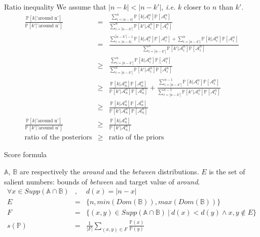 \documentclass[xcolor=table, hyperref={pdfpagelabels=false}]{beamer}
\begin{document}
\begin{frame}{Ratio inequality}
\normalsize
We assume that $|n-k| < |n-k'|$, \textit{i.e.} $k$ closer to $n$ than $k'$.
\tiny
\begin{eqnarray*}
	\frac{\mathds{P}[k|\mbox{'around n'}]}{\mathds{P}[k'|\mbox{'around n'}]} &=& \frac{\sum_{i = |n-k|}^n \mathds{P}[k|\mathcal{A}^n_i]\mathds{P}[\mathcal{A}^n_i]}{\sum_{i = |n-k'|}^n \mathds{P}[k'|\mathcal{A}^n_i]\mathds{P}[\mathcal{A}^n_i]}\\
	&=& \frac{\sum_{i = |n-k|}^{|n-k'|-1} \mathds{P}[k|\mathcal{A}^n_i]\mathds{P}[\mathcal{A}^n_i] +\sum_{i = |n-k'|}^n \mathds{P}[k|\mathcal{A}^n_i]\mathds{P}[\mathcal{A}^n_i]}{\sum_{i = |n-k'|}^n \mathds{P}[k'|\mathcal{A}^n_i]\mathds{P}[\mathcal{A}^n_i]}\\
	&\geq& \frac{\sum_{i = |n-k'|}^n \mathds{P}[k|\mathcal{A}^n_i]\mathds{P}[\mathcal{A}^n_i]}{\sum_{i = |n-k'|}^n \mathds{P}[k'|\mathcal{A}^n_i]\mathds{P}[\mathcal{A}^n_i]} \\
	&\geq& \frac{\mathds{P}[k|\mathcal{A}^n_n]\mathds{P}[\mathcal{A}^n_n]}{\mathds{P}[k'|\mathcal{A}^n_n]\mathds{P}[\mathcal{A}^n_n]} + \frac{\sum_{i = |n-k'|}^{n-1} \mathds{P}[k|\mathcal{A}^n_i]\mathds{P}[\mathcal{A}^n_i]}{\sum_{i = |n-k'|}^{n-1} \mathds{P}[k'|\mathcal{A}^n_i]\mathds{P}[\mathcal{A}^n_i]} \\
	&\geq& \frac{\mathds{P}[k|\mathcal{A}^n_n]\mathds{P}[\mathcal{A}^n_n]}{\mathds{P}[k'|\mathcal{A}^n_n]\mathds{P}[\mathcal{A}^n_n]} \\
	\frac{\mathds{P}[k|\mbox{'around n'}]}{\mathds{P}[k'|\mbox{'around n'}]} &\geq& \frac{\mathds{P}[k|\mathcal{A}^n_n]}{\mathds{P}[k'|\mathcal{A}^n_n]} \\
	\mbox{ratio of the posteriors} &\geq& \mbox{ratio of the priors}
\end{eqnarray*}
\end{frame}

\begin{frame}{Score formula}

$\mathds{A}$, $\mathds{B}$ are respectively the \textit{around} and the \textit{between} distributions. $E$ is the set of salient numbers: bounds of \textit{between} and target value of \textit{around}.
\footnotesize
\begin{eqnarray*}
	\forall x \in Supp(\mathds{A}\cap\mathds{B})&,& d(x) = |n-x| \\
	E &=& \lbrace n, min(Dom(\mathds{B})), max(Dom(\mathds{B})) \rbrace \\
	F &=& \lbrace (x, y) \in Supp(\mathds{A}\cap\mathds{B}) \ | \ d(x) < d(y) \wedge x, y \notin E \rbrace \\
	s(\mathds{P}) &=& \frac{1}{|F|} \sum_{(x, y) \in F}\frac{\mathds{P}(x)}{\mathds{P}(y)}
\end{eqnarray*}
\end{frame}
\end{document}
